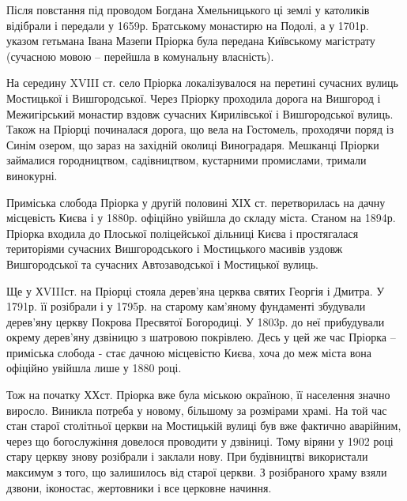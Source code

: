 
Після повстання під проводом Богдана Хмельницького ці землі у католиків
відібрали і передали у 1659р. Братському монастирю на Подолі, а у 1701р. указом
гетьмана Івана Мазепи Пріорка була передана Київському магістрату (сучасною
мовою – перейшла в комунальну власність). 

На середину XVIII ст. село Пріорка локалізувалося на перетині сучасних вулиць
Мостицької і Вишгородської. Через Пріорку проходила дорога на Вишгород і
Межигірський монастир вздовж сучасних Кирилівської і Вишгородської вулиць.
Також на Пріорці починалася дорога, що вела на Гостомель, проходячи поряд із
Синім озером, що зараз на західній околиці Виноградаря. Мешканці Пріорки
займалися городництвом, садівництвом, кустарними промислами, тримали винокурні. 


Приміська слобода Пріорка у другій половині ХІХ ст. перетворилась на дачну
місцевість Києва і у 1880р. офіційно увійшла до складу міста. Станом на
1894р. Пріорка входила до Плоської поліцейської дільниці Києва і
простягалася територіями сучасних Вишгородського і Мостицького масивів
уздовж Вишгородської та сучасних Автозаводської і Мостицької вулиць. 

Ще у ХVIIIст. на Пріорці стояла дерев’яна церква святих Георгія і Дмитра. У
1791р. її розібрали і у 1795р. на старому кам’яному фундаменті збудували
дерев’яну церкву Покрова Пресвятої Богородиці. У 1803р. до неї прибудували
окрему дерев’яну дзвіницю з шатровою покрівлею. Десь у цей же час Пріорка –
приміська слобода - стає дачною місцевістю Києва, хоча до меж міста вона
офіційно увійшла лише у 1880 році. 


Тож на початку ХХст. Пріорка вже була міською окраїною, її населення значно
виросло. Виникла потреба у новому, більшому за розмірами храмі. На той час
стан старої столітньої церкви на Мостицькій вулиці був вже фактично
аварійним, через що богослужіння довелося проводити у дзвіниці. Тому віряни
у 1902 році стару церкву знову розібрали і заклали нову. При будівництві
використали максимум з того, що залишилось від старої церкви. З розібраного
храму взяли дзвони, іконостас, жертовники і все церковне начиння. 

\begin{multicols}{2}
\end{multicols}


